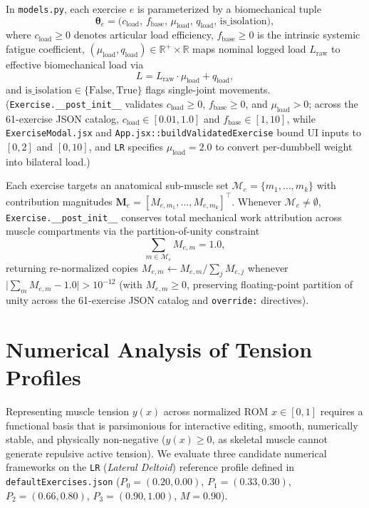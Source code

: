 \documentclass[10pt,twocolumn,letterpaper]{article}
\theoremstyle{plain}
\theoremstyle{definition}
\begin{document}
In \texttt{models.py}, each exercise $e$ is parameterized by a biomechanical tuple
\begin{equation}
  \bm{\theta}_e = \bigl(c_{\mathrm{load}},\, f_{\mathrm{base}},\, \mu_{\mathrm{load}},\, q_{\mathrm{load}},\, \mathrm{is\_isolation}\bigr),
\end{equation}
where $c_{\mathrm{load}} \ge 0$ denotes articular load efficiency, $f_{\mathrm{base}} \ge 0$ is the intrinsic systemic fatigue coefficient, $(\mu_{\mathrm{load}}, q_{\mathrm{load}}) \in \mathbb{R}^+ \times \mathbb{R}$ maps nominal logged load $L_{\mathrm{raw}}$ to effective biomechanical load via
\begin{equation}
  L = L_{\mathrm{raw}} \cdot \mu_{\mathrm{load}} + q_{\mathrm{load}},
\end{equation}
and $\mathrm{is\_isolation} \in \{\mathrm{False}, \mathrm{True}\}$ flags single-joint movements. (\texttt{Exercise.\_\_post\_init\_\_} validates $c_{\mathrm{load}} \ge 0$, $f_{\mathrm{base}} \ge 0$, and $\mu_{\mathrm{load}} > 0$; across the 61-exercise JSON catalog, $c_{\mathrm{load}} \in [0.01, 1.0]$ and $f_{\mathrm{base}} \in [1, 10]$, while \texttt{ExerciseModal.jsx} and \texttt{App.jsx::buildValidatedExercise} bound UI inputs to $[0, 2]$ and $[0, 10]$, and \texttt{LR} specifies $\mu_{\mathrm{load}} = 2.0$ to convert per-dumbbell weight into bilateral load.)

Each exercise targets an anatomical sub-muscle set $\mathcal{M}_e = \{m_1, \dots, m_k\}$ with contribution magnitudes $\mathbf{M}_e = [M_{e,m_1}, \dots, M_{e,m_k}]^\top$. Whenever $\mathcal{M}_e \ne \emptyset$, \texttt{Exercise.\_\_post\_init\_\_} conserves total mechanical work attribution across muscle compartments via the partition-of-unity constraint
\begin{equation}
  \sum_{m \in \mathcal{M}_e} M_{e,m} = 1.0,
  \label{eq:partition}
\end{equation}
returning re-normalized copies $M_{e,m} \leftarrow M_{e,m} / \sum_j M_{e,j}$ whenever $\lvert \sum_m M_{e,m} - 1.0 \rvert > 10^{-12}$ (with $M_{e,m} \ge 0$, preserving floating-point partition of unity across the 61-exercise JSON catalog and \texttt{override:} directives).

\section{Numerical Analysis of Tension Profiles}
\label{sec:numerical}

Representing muscle tension $y(x)$ across normalized ROM $x \in [0, 1]$ requires a functional basis that is parsimonious for interactive editing, smooth, numerically stable, and physically non-negative ($y(x) \ge 0$, as skeletal muscle cannot generate repulsive active tension). We evaluate three candidate numerical frameworks on the \texttt{LR} (\emph{Lateral Deltoid}) reference profile defined in \texttt{defaultExercises.json} ($P_0=(0.20, 0.00)$, $P_1=(0.33, 0.30)$, $P_2=(0.66, 0.80)$, $P_3=(0.90, 1.00)$, $M = 0.90$).
\end{document}
